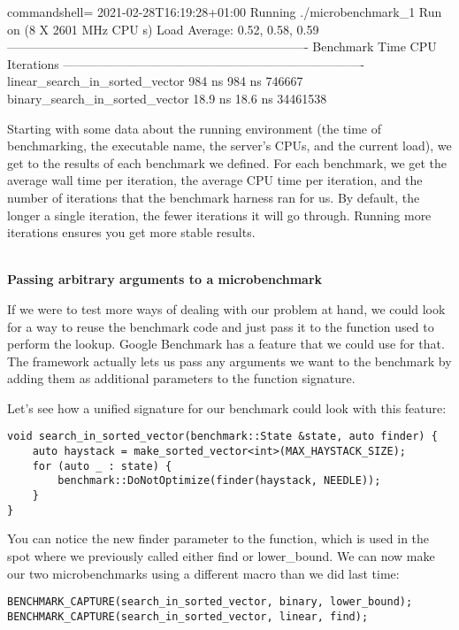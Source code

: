 \begin{tcblisting}{commandshell={}}
2021-02-28T16:19:28+01:00
Running ./microbenchmark_1
Run on (8 X 2601 MHz CPU s)
Load Average: 0.52, 0.58, 0.59
-------------------------------------------------------------------------
Benchmark Time CPU Iterations
-------------------------------------------------------------------------
linear_search_in_sorted_vector 984 ns 984 ns 746667
binary_search_in_sorted_vector 18.9 ns 18.6 ns 34461538
\end{tcblisting}

Starting with some data about the running environment (the time of benchmarking, the executable name, the server's CPUs, and the current load), we get to the results of each benchmark we defined. For each benchmark, we get the average wall time per iteration, the average CPU time per iteration, and the number of iterations that the benchmark harness ran for us. By default, the longer a single iteration, the fewer iterations it will go through. Running more iterations ensures you get more stable results.

\hspace*{\fill} \\ %
\noindent
\textbf{Passing arbitrary arguments to a microbenchmark}

If we were to test more ways of dealing with our problem at hand, we could look for a way to reuse the benchmark code and just pass it to the function used to perform the lookup. Google Benchmark has a feature that we could use for that. The framework actually lets us pass any arguments we want to the benchmark by adding them as additional parameters to the function signature.

Let's see how a unified signature for our benchmark could look with this feature:

\begin{lstlisting}[style=styleCXX]
void search_in_sorted_vector(benchmark::State &state, auto finder) {
	auto haystack = make_sorted_vector<int>(MAX_HAYSTACK_SIZE);
	for (auto _ : state) {
		benchmark::DoNotOptimize(finder(haystack, NEEDLE));
	}
}
\end{lstlisting}

You can notice the new finder parameter to the function, which is used in the spot where we previously called either find or lower\_bound. We can now make our two microbenchmarks using a different macro than we did last time:


\begin{lstlisting}[style=styleCXX]
BENCHMARK_CAPTURE(search_in_sorted_vector, binary, lower_bound);
BENCHMARK_CAPTURE(search_in_sorted_vector, linear, find);
\end{lstlisting}

